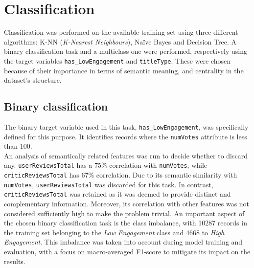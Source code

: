 
\chapter{Classification}
\label{ch:capitolo3}
Classification was performed on the available training set using three different algorithms: K-NN (\textit{K-Nearest Neighbours}), Naïve Bayes and Decision Tree.
A binary classification task and a multiclass one were performed, respectively using the target variables \texttt{has\_LowEngagement} and \texttt{titleType}.
These were chosen because of their importance in terms of semantic meaning, and centrality in the dataset's structure.


\section{Binary classification}\label{sec:binary_classification}
The binary target variable used in this task, \texttt{has\_LowEngagement}, was specifically defined for this purpose. 
It identifies records where the \texttt{numVotes} attribute is less than 100.\\
An analysis of semantically related features was run to decide whether to discard any.
\texttt{userReviewsTotal} has a 75\% correlation with
\texttt{numVotes}, while \texttt{criticReviewsTotal} has 67\% correlation.
Due to its semantic similarity with \texttt{numVotes}, \texttt{userReviewsTotal} was discarded for this task.
In contrast, \texttt{criticReviewsTotal} was retained as it was deemed to provide distinct and complementary information. 
Moreover, its correlation with other features was not considered sufficiently high to make the problem trivial.
An important aspect of the chosen binary classification task is the class imbalance, with 10287 records in the training set
belonging to the \textit{Low Engagement} class and 4668 to \textit{High Engagement}.
This imbalance was taken into account during model training and evaluation, with a focus on
macro-averaged F1-score to mitigate its impact on the results.


